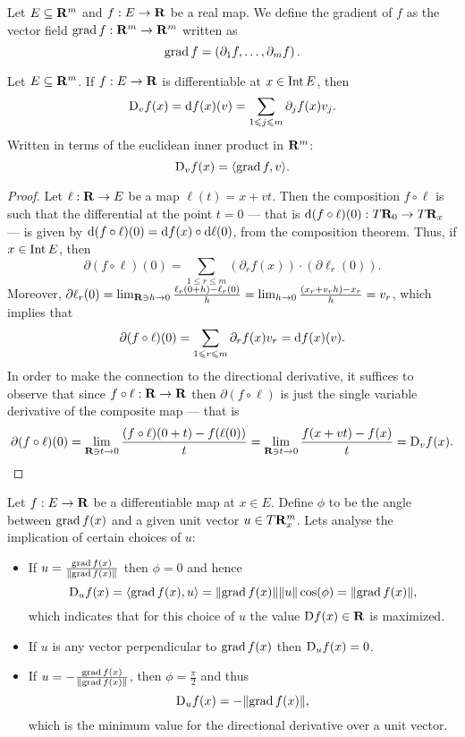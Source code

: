 \begin{definition}[Gradient]
  Let \(E \subseteq \mathbf{R}^m\) and \(f: E \to \mathbf{R}\) be a real map. We define the
  gradient of \(f\) as the vector field \(\operatorname{grad} f: \mathbf{R}^m \to \mathbf{R}^m\) written as
  \[
    \operatorname{grad} f = \left( \partial_1 f, \dots, \partial_m f \right).
  \]
\end{definition}

\begin{corollary}
  Let \(E \subseteq \mathbf{R}^m\). If \(f: E \to \mathbf{R}\) is differentiable at \(x \in \operatorname{Int}
  E\), then
  \[
    \mathrm{D}_v f(x) = \mathrm{d} f(x)(v) = \sum_{1 \leqslant j \leqslant m} \partial_j f(x) v_j.
  \]
  Written in terms of the euclidean inner product in \(\mathbf{R}^m\):
  \[
    \mathrm{D}_v f(x) = \langle \operatorname{grad} f, v \rangle.
  \]
\end{corollary}

\begin{proof}
  Let \(\ell: \mathbf{R} \to E\) be a map \(\ell(t) = x + v t\). Then the composition
  \(f \circ \ell\) is such that the differential at the point \(t = 0\) --- that
  is \(\mathrm{d} (f \circ \ell)(0): T\mathbf{R}_0 \to T\mathbf{R}_x\) --- is given by \(\mathrm{d} (f
  \circ \ell)(0) = \mathrm{d} f(x) \circ \mathrm{d} \ell(0)\), from the composition
  theorem. Thus, if \(x \in \operatorname{Int} E\), then
  \[
    \partial (f \circ \ell)(0) =
    \sum_{1 \leq r \leq m}
    (\partial_r f(x)) \cdot (\partial \ell_r(0)).
  \]
  Moreover, \(\partial \ell_r(0) = \lim_{\mathbf{R} \ni h \to 0} \frac{\ell_r(0 + h) -
  \ell_r(0)}{h}  = \lim_{h \to 0} \frac{(x_r + v_r h) - x_r}{h} = v_r\), which
  implies that
  \[
    \partial (f\circ \ell)(0) = \sum_{1 \leqslant r \leqslant m} \partial_r f(x) v_r =
    \mathrm{d} f(x)(v).
  \]
  In order to make the connection to the directional derivative, it suffices to
  observe that since \(f \circ \ell: \mathbf{R} \to \mathbf{R}\) then \(\partial (f \circ
  \ell)\) is just the single variable derivative of the composite map ---
  that is
  \[
    \partial (f \circ \ell)(0) =
    \lim_{\mathbf{R} \ni t \to 0} \frac{(f \circ \ell)(0 + t) - f(\ell(0))} t =
    \lim_{\mathbf{R} \ni t \to 0} \frac{f(x + vt) - f(x)} t = \mathrm{D}_v f(x).
  \]
\end{proof}

Let \(f: E \to \mathbf{R}\) be a differentiable map at \(x \in E\). Define \(\phi\) to
be the angle between \(\operatorname{grad} f(x)\) and a given unit vector \(u \in T\mathbf{R}^m_x\).
Lets analyse the implication of certain choices of \(u\):
\begin{itemize}
  \item If \(u = \frac{\operatorname{grad} f(x)}{\lVert\operatorname{grad} f(x)\rVert}\) then \(\phi = 0\) and
    hence
    \[
      \mathrm{D}_u f(x) = \langle \operatorname{grad} f(x), u \rangle = \lVert\operatorname{grad} f(x)\rVert \lVert u\rVert
      \cos(\phi) = \lVert\operatorname{grad} f(x)\rVert,
    \]
    which indicates that for this choice of \(u\) the value \(\mathrm{D} f(x) \in
    \mathbf{R}\) is maximized.
  \item If \(u\) is any vector perpendicular to \(\operatorname{grad} f(x)\) then \(\mathrm{D}_u
    f(x) = 0\).
  \item If \(u = - \frac{\operatorname{grad} f(x)}{\lVert\operatorname{grad} f(x)\rVert}\), then \(\phi = \frac
    \pi 2\) and thus
    \[
      \mathrm{D}_u f(x) = -\lVert\operatorname{grad} f(x)\rVert,
    \]
    which is the minimum value for the directional derivative over a unit
    vector.
\end{itemize}

